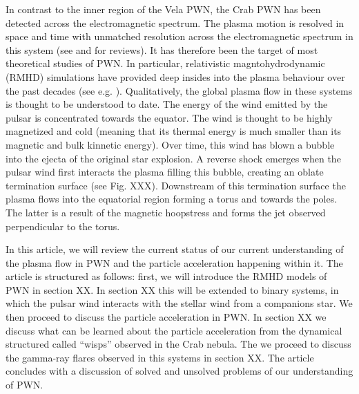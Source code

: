 In contrast to the inner region of the Vela PWN, the Crab PWN has been detected across the electromagnetic spectrum. The plasma motion is resolved in space and time with unmatched resolution across the electromagnetic spectrum in this system (see \citet{Hester_2008} and \citet{BuehlerBlandford2013a} for reviews). It has therefore been the target of most theoretical studies of PWN. In particular, relativistic magntohydrodynamic (RMHD) simulations have provided deep insides into the plasma behaviour over the past decades (see e.g.  \citet{Komissarov_2004,Del_Zanna_2006,Porth_2013}). Qualitatively, the global plasma flow in these systems is thought to be understood to date. The energy of the wind emitted by the pulsar is concentrated towards the equator. The wind is thought to be highly magnetized and cold (meaning that its thermal energy is much smaller than its magnetic and bulk kinnetic energy). Over time, this wind has blown a bubble into the ejecta of the original star explosion. A reverse shock emerges when the pulsar wind first interacts the plasma filling this bubble, creating an oblate termination surface (see Fig. XXX). Downstream of this termination surface the plasma flows into the equatorial region forming a torus and towards the poles. The latter is a result of the magnetic hoopstress and forms the jet observed perpendicular to the torus.

In this article, we will review the current status of our current understanding of the plasma flow in PWN and the particle acceleration happening within it.  The article is structured as follows: first, we will introduce the RMHD models of PWN in section XX. In section XX this will be extended to binary systems, in which the pulsar wind interacts with the stellar wind from a companions star. We then proceed to discuss the particle acceleration in PWN. In section XX we discuss what can be learned about the particle acceleration from the dynamical structured called ``wisps'' observed in the Crab nebula. The we proceed to discuss the gamma-ray flares observed in this systems in section XX. The article concludes with a discussion of solved and unsolved problems of our understanding of PWN.